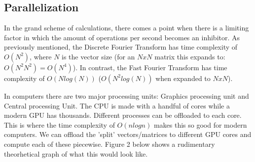 \documentclass{article}
\begin{document}
\begin{center}
    \section{Parallelization}    
    \end{center}
    
    \begin{sloppypar}
        \indent{} In the grand scheme of calculations, there comes a point when there is a limiting factor in which the amount of operations per second becomes an inhibitor. As previously mentioned, the Discrete Fourier Transform has time complexity of $O(N^2)$, where $N$ is the vector size (for an $NxN$ matrix this expands to: $O(N^2N^2) = O(N^4)$). In contrast, the Fast Fourier Transform has time complexity of $O(Nlog(N))$ ($O(N^2log(N))$ when expanded to $NxN$).
    \end{sloppypar}
    \vspace{2mm}
    \begin{center}
    \end{center}
    \begin{sloppypar}
        \indent{}In computers there are two major processing units: Graphics processing unit and Central processing Unit. The CPU is made with a handful of cores while a modern GPU has thousands. Different processes can be offloaded to each core.
        This is where the time complexity of $O(nlogn)$ makes this so good for modern computers. We can offload the 'split' vectors/matrices to different GPU cores and compute each of these piecewise. Figure 2 below shows a rudimentary theorhetical graph of what this would look like. 
    \end{sloppypar}
\end{document}

